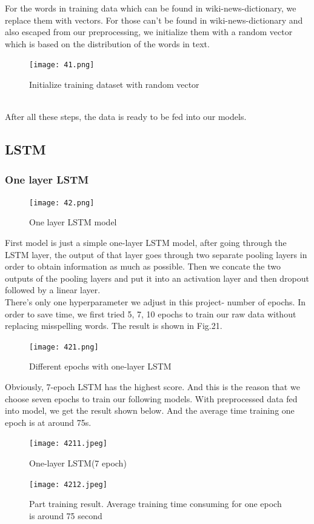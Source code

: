 \documentclass{article}
\begin{document}
\noindent For the words in training data which can  be found in wiki-news-dictionary, we replace them with vectors. For those can’t be found in wiki-news-dictionary and also escaped from our preprocessing, we initialize them with a random vector which is based on the distribution of the words in text.\\
\begin{figure}[h]
	\centering
	\texttt{[image: 41.png]}
	\caption{Initialize training dataset with random vector}
\end{figure}\\
\noindent After all these steps, the data is ready to be fed into our models.\\

\subsection{LSTM}
\subsubsection{One layer LSTM}
\begin{figure}[h]
	\centering
	\texttt{[image: 42.png]}
	\caption{One layer LSTM model}
\end{figure}
\noindent First model is just a simple one-layer LSTM model, after going through the LSTM layer, the output of that layer goes through two separate pooling layers in order to obtain information as much as possible. Then we concate the two outputs of the pooling layers and put it into an activation layer and then dropout followed by a linear layer.\\

\noindent There’s only one hyperparameter we adjust in this project- number of epochs. In order to save time, we first tried 5, 7, 10 epochs to train our raw data without replacing misspelling words. The result is shown in Fig.21.\\
\begin{figure}[H]
	\centering
	\texttt{[image: 421.png]}
	\caption{Different epochs with one-layer LSTM}
\end{figure}
\noindent Obviously, 7-epoch LSTM has the highest score. And this is the reason that we choose seven epochs to train our following models.
With preprocessed data fed into model, we get the result shown below. And the average time training one epoch is at around 75s.
\begin{figure}[H]
	\centering
	\texttt{[image: 4211.jpeg]}
	\caption{One-layer LSTM(7 epoch)
	}
\end{figure}
\begin{figure}[H]
	\centering
	\texttt{[image: 4212.jpeg]}
	\caption{Part training result. Average training time consuming for one epoch is around 75 second
	}
\end{figure}
\end{document}
